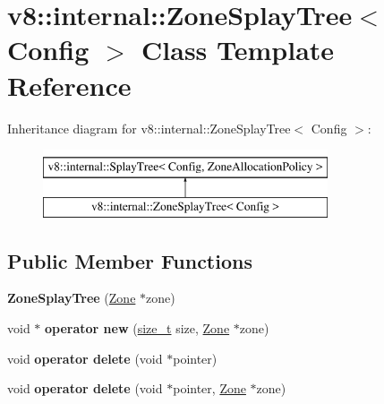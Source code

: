 \hypertarget{classv8_1_1internal_1_1ZoneSplayTree}{}\section{v8\+:\+:internal\+:\+:Zone\+Splay\+Tree$<$ Config $>$ Class Template Reference}
\label{classv8_1_1internal_1_1ZoneSplayTree}
Inheritance diagram for v8\+:\+:internal\+:\+:Zone\+Splay\+Tree$<$ Config $>$\+:\begin{figure}[H]
\begin{center}
\leavevmode
\includegraphics[height=2.000000cm]{classv8_1_1internal_1_1ZoneSplayTree}
\end{center}
\end{figure}
\subsection*{Public Member Functions}
\begin{DoxyCompactItemize}
\item 
\mbox{\label{classv8_1_1internal_1_1ZoneSplayTree_a6868fea9a91c5e1fc46f1abf51dd7af8}} 
{\bfseries Zone\+Splay\+Tree} (\mbox{\hyperlink{classv8_1_1internal_1_1Zone}{Zone}} $\ast$zone)
\item 
\mbox{\label{classv8_1_1internal_1_1ZoneSplayTree_a5da53044bc282b029dd77c91e5999a88}} 
void $\ast$ {\bfseries operator new} (\mbox{\hyperlink{classsize__t}{size\+\_\+t}} size, \mbox{\hyperlink{classv8_1_1internal_1_1Zone}{Zone}} $\ast$zone)
\item 
\mbox{\label{classv8_1_1internal_1_1ZoneSplayTree_aafa8e3637ae4d23427728fbc49a5e2f5}} 
void {\bfseries operator delete} (void $\ast$pointer)
\item 
\mbox{\label{classv8_1_1internal_1_1ZoneSplayTree_aea0e42a989045676e5ae837b96397d48}} 
void {\bfseries operator delete} (void $\ast$pointer, \mbox{\hyperlink{classv8_1_1internal_1_1Zone}{Zone}} $\ast$zone)
\end{DoxyCompactItemize}
